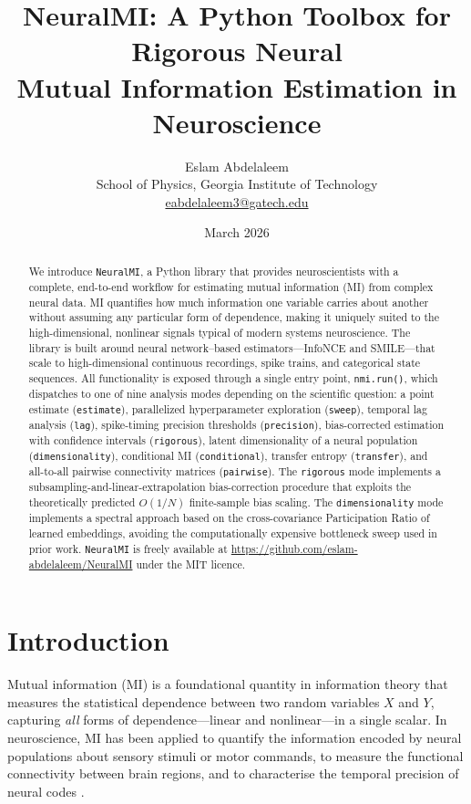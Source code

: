 \documentclass[12pt]{article}
\title{%
  \textbf{NeuralMI: A Python Toolbox for Rigorous Neural\\
  Mutual Information Estimation in Neuroscience}%
}
\author{%
  Eslam Abdelaleem\\
  \small School of Physics, Georgia Institute of Technology\\
  \small \href{mailto:eabdelaleem3@gatech.edu}{eabdelaleem3@gatech.edu}
}
\date{March 2026}
\newcommand{\nmi}{\texttt{NeuralMI}}
\newcommand{\api}[1]{\texttt{#1}}
\begin{document}
\maketitle
\onehalfspacing

\begin{abstract}
We introduce \nmi{}, a Python library that provides neuroscientists with a
complete, end-to-end workflow for estimating mutual information (MI) from
complex neural data.  MI quantifies how much information one variable carries
about another without assuming any particular form of dependence, making it
uniquely suited to the high-dimensional, nonlinear signals typical of modern
systems neuroscience.  The library is built around neural network–based
estimators---InfoNCE and SMILE---that scale to high-dimensional continuous
recordings, spike trains, and categorical state sequences.  All functionality
is exposed through a single entry point, \api{nmi.run()}, which dispatches to
one of nine analysis modes depending on the scientific question: a point
estimate (\api{estimate}), parallelized hyperparameter exploration (\api{sweep}),
temporal lag analysis (\api{lag}), spike-timing precision thresholds
(\api{precision}), bias-corrected estimation with confidence intervals
(\api{rigorous}), latent dimensionality of a neural population (\api{dimensionality}),
conditional MI (\api{conditional}), transfer entropy (\api{transfer}), and
all-to-all pairwise connectivity matrices (\api{pairwise}).  The \api{rigorous}
mode implements a subsampling-and-linear-extrapolation bias-correction procedure
that exploits the theoretically predicted $O(1/N)$ finite-sample bias scaling.
The \api{dimensionality} mode implements a spectral approach based on the
cross-covariance Participation Ratio of learned embeddings, avoiding the
computationally expensive bottleneck sweep used in prior work.  \nmi{} is
freely available at \url{https://github.com/eslam-abdelaleem/NeuralMI} under
the MIT licence.
\end{abstract}

\tableofcontents
\newpage

\section{Introduction}
\label{sec:intro}

Mutual information (MI) is a foundational quantity in information theory that
measures the statistical dependence between two random variables $X$ and $Y$,
capturing \emph{all} forms of dependence—linear and nonlinear—in a single
scalar.  In neuroscience, MI has been applied to quantify the information
encoded by neural populations about sensory stimuli or motor commands, to
measure the functional connectivity between brain regions, and to characterise
the temporal precision of neural codes
\citep{borst1999information,quian2009measuring,timme2018tutorial}.
\end{document}
